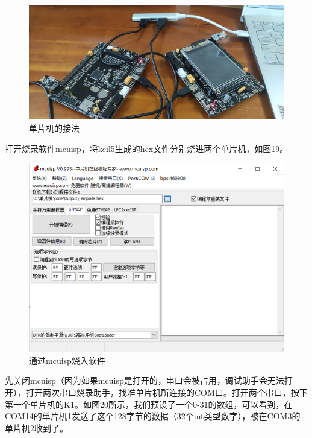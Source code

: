 \documentclass[UTF8,a4paper,11pt]{article}
\begin{document}
\begin{figure}[htbp]
    \centering
    \includegraphics[scale=0.15]{p18.jpg}
    \caption{单片机的接法}
\end{figure} 

打开烧录软件mcuisp，将keil5生成的hex文件分别烧进两个单片机，如图19。

\begin{figure}[htbp]
    \centering
    \includegraphics[scale=0.6]{p19.png}
    \caption{通过mcuisp烧入软件}
\end{figure}

先关闭mcuisp（因为如果mcuisp是打开的，串口会被占用，调试助手会无法打开），打开两次串口烧录助手，找准单片机所连接的COM口。打开两个串口，按下第一个单片机的K1。如图20所示，我们预设了一个0-31的数组，可以看到，在COM14的单片机1发送了这个128字节的数据（32个int类型数字），被在COM3的单片机2收到了。
\end{document}

